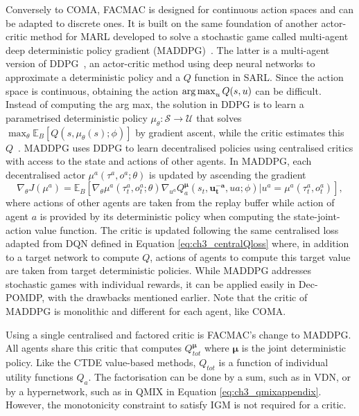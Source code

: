 Conversely to COMA, FACMAC is designed for continuous action spaces and can be adapted to discrete ones.
It is built on the same foundation of another actor-critic method for MARL developed to solve a stochastic game called multi-agent deep deterministic policy gradient (MADDPG)~\citep{lowe2017multi}.
The latter is a multi-agent version of DDPG~\citep{lillicrap2015continuous}, an actor-critic method using deep neural networks to approximate a deterministic policy and a $Q$ function in SARL.
Since the action space is continuous, obtaining the action $\operatorname*{arg\,max}_u Q(s, u)$ can be difficult.
Instead of computing the arg max, the solution in DDPG is to learn a parametrised deterministic policy $\mu_\theta:\mathcal{S}\rightarrow\mathcal{U}$ that solves $\max_\theta \mathbb{E}_B[Q(s, \mu_\theta(s); \phi)]$ by gradient ascent, while the critic estimates this $Q$~\citep{silver2014deterministic}.
MADDPG uses DDPG to learn decentralised policies using centralised critics with access to the state and actions of other agents.
In MADDPG, each decentralised actor $\mu^a(\tau^a, o^a;\theta)$ is updated by ascending the gradient
\begin{equation}
\label{eq:ch3_maddpg_grad}
    \nabla_\theta J(\mu^a) = \mathbb{E}_B\left[\nabla_{\theta} \mu^a(\tau_t^a, o_t^a;\theta) \nabla_{u^a} Q_a^{\mathbf{\mu}}(s_t, \mathbf{u_t^{-a}}, u a; \phi)|u^a=\mu^a(\tau_t^a, o_t^a)\right],
\end{equation}
where actions of other agents are taken from the replay buffer while action of agent $a$ is provided by its deterministic policy when computing the state-joint-action value function.
The critic is updated following the same centralised loss adapted from DQN defined in Equation \ref{eq:ch3_centralQloss} where, in addition to a target network to compute $Q$, actions of agents to compute this target value are taken from target deterministic policies.
While MADDPG addresses stochastic games with individual rewards, it can be applied easily in Dec-POMDP, with the drawbacks mentioned earlier.
Note that the critic of MADDPG is monolithic and different for each agent, like COMA.

Using a single centralised and factored critic is FACMAC's change to MADDPG.
All agents share this critic that computes $Q_{tot}^{\mathbf{\mu}}$ where $\mathbf{\mu}$ is the joint deterministic policy.
Like the CTDE value-based methods, $Q_{tot}$ is a function of individual utility functions $Q_a$.
The factorisation can be done by a sum, such as in VDN, or by a hypernetwork, such as in QMIX in Equation \ref{eq:ch3_qmixappendix}.
However, the monotonicity constraint to satisfy IGM is not required for a critic.

